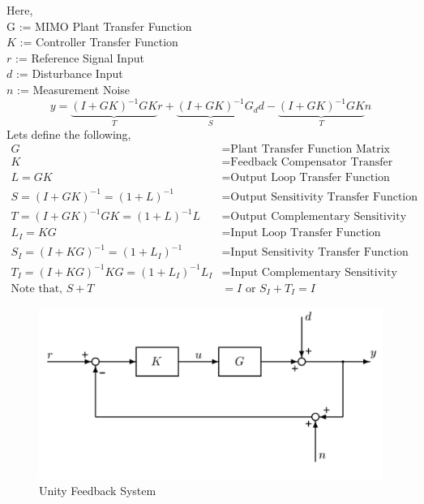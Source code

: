 \documentclass[12pt]{article}
\begin{document}
	\noindent Here, \\
	G := MIMO Plant Transfer Function\\
	$K$ := Controller Transfer Function\\
	$r$ := Reference Signal Input\\
	$d$ := Disturbance Input\\
	$n$ := Measurement Noise\\
	
	\begin{equation}
	y = \underbrace{(I + GK)^{-1}GK}_{T}r + \underbrace{(I + GK)^{-1}}_{S}G_dd - \underbrace{(I + GK)^{-1}GK}_{T}n
	\end{equation}
	Lets define the following,
	\begin{equation*}
	\begin{split}
	G &= \text{Plant Transfer Function Matrix}\\
	K &= \text{Feedback Compensator Transfer Function}\\
	L = GK &= \text{Output Loop Transfer Function}\\
	S = (I + GK)^{-1} = (1 + L)^{-1} &= \text{Output Sensitivity Transfer Function}\\
	T = (I + GK)^{-1}GK = (1 + L)^{-1}L &= \text{Output Complementary Sensitivity function}\\
	L_I = KG &= \text{Input Loop Transfer Function}\\
	S_I = (I + KG)^{-1} = (1 + L_I)^{-1} &= \text{Input Sensitivity Transfer Function}\\
	T_I = (I + KG)^{-1}KG = (1 + L_I)^{-1}L_I &= \text{Input Complementary Sensitivity function}\\
	\text{Note that, } S + T &= I \text{ or } S_I + T_I = I
	\end{split}
	\end{equation*}
	
	\begin{figure}[H]
		\centering
		\includegraphics[width=0.7\linewidth]{fig2}
		\caption{Unity Feedback System}
		\label{fig:fig2}
	\end{figure}
	
\end{document}
